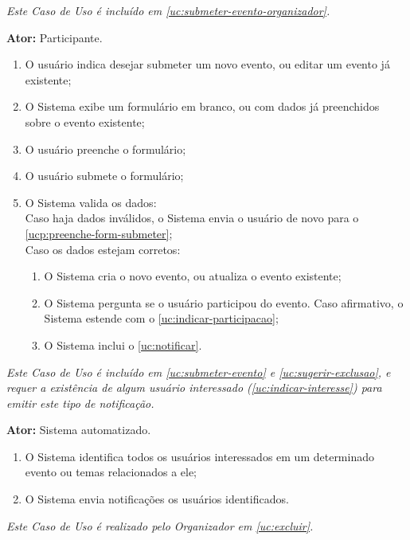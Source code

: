 \documentclass[12pt,a4paper,twoside,hyphens,english,brazil]{abntex2}
\begin{document}
{
\emph{Este Caso de Uso é incluído em \ref{uc:submeter-evento-organizador}.}

\textbf{Ator:} Participante.
\begin{enumerate}[itemsep=-1ex,topsep=-1ex]
	\item O usuário indica desejar submeter um novo evento, ou editar um evento já existente;
	\item O Sistema exibe um formulário em branco, ou com dados já preenchidos sobre o evento existente; \label{ucp:preenche-form-submeter}
	\item O usuário preenche o formulário;
	\item O usuário submete o formulário;
	\item O Sistema valida os dados:
		\\Caso haja dados inválidos, o Sistema envia o usuário de novo para o \autoref{ucp:preenche-form-submeter};
		\\Caso os dados estejam corretos:
			\begin{enumerate}
				\item O Sistema cria o novo evento, ou atualiza o evento existente;
				\item O Sistema pergunta se o usuário participou do evento. Caso afirmativo, o Sistema estende com o \ref{uc:indicar-participacao};
				\item O Sistema inclui o \ref{uc:notificar}.
			\end{enumerate}
\end{enumerate}

\emph{Este Caso de Uso é incluído em \ref{uc:submeter-evento} e \ref{uc:sugerir-exclusao}, e requer a existência de algum usuário interessado (\ref{uc:indicar-interesse}) para emitir este tipo de notificação.}

\textbf{Ator:} Sistema automatizado.
\begin{enumerate}[itemsep=-1ex,topsep=-1ex]
	\item O Sistema identifica todos os usuários interessados em um determinado evento ou temas relacionados a ele;
	\item O Sistema envia notificações os usuários identificados.
\end{enumerate}

\emph{Este Caso de Uso é realizado pelo Organizador em \ref{uc:excluir}.}

}
\end{document}
